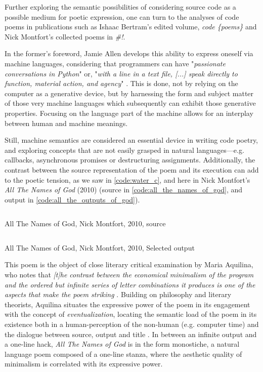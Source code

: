 Further exploring the semantic possibilities of considering source code as a possible medium for poetic expression, one can turn to the analyses of code poems in publications such as Ishaac Bertram's edited volume, \emph{code \{poems\}} and Nick Montfort's collected poems in \emph{\#!}.

In the former's foreword, Jamie Allen develops this ability to express oneself via machine languages, considering that programmers can have "\emph{passionate conversations in Python}" or, "\emph{with a line in a text file, [...] speak directly to function, material action, and agency}" \citep{bertram_code_2012}. This is done, not by relying on the computer as a generative device, but by harnessing the form and subject matter of those very machine languages which subsequently can exhibit those generative properties. Focusing on the language part of the machine allows for an interplay between human and machine meanings.

Still, machine semantics are considered an essential device in writing code poetry, and exploring concepts that are not easily grasped in natural languages—e.g. callbacks, asynchronous promises or destructuring assignments. Additionally, the contrast between the source representation of the poem and its execution can add to the poetic tension, as we saw in \autoref{code:water_c}, and here in Nick Montfort's \emph{All The Names of God} (2010) (source in \autoref{code:all_the_names_of_god}, and output in \autoref{code:all_the_outputs_of_god}).

\begin{listing}
  \inputminted{perl}{./corpus/all_the_names_of_god.pl}
  \caption{All The Names of God, Nick Montfort, 2010, source}
  \label{code:all_the_names_of_god}
\end{listing}

\begin{listing}
  \inputminted{text}{./corpus/all_the_names_of_god.txt}
  \caption{All The Names of God, Nick Montfort, 2010, Selected output}
  \label{code:all_the_outputs_of_god}
\end{listing}

This poem is the object of close literary critical examination by Maria Aquilina, who notes that \emph{[t]he contrast between the economical minimalism of the program and the ordered but infinite series of letter combinations it produces is one of the aspects that make the poem striking} \citep{aquilina_computational_2015}. Building on philosophy and literary theorists, Aquilina situates the expressive power of the poem in its engagement with the concept of \emph{eventualization}, locating the semantic load of the poem in its existence both in a human-perception of the non-human (e.g. computer time) and the dialogue between source, output and title \citep{aquilina_computational_2015}. In between an infinite output and a one-line hack, \emph{All The Names of God} is in the form monostiche, a natural language poem composed of a one-line stanza, where the aesthetic quality of minimalism is correlated with its expressive power.

